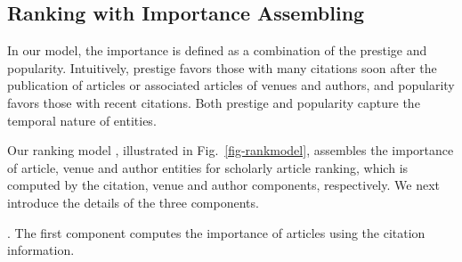 


\subsection{Ranking with Importance Assembling}
\label{subsec-ensemble}


In our model, the importance is defined as a combination of the prestige and popularity. Intuitively, prestige favors those with many citations soon after the publication of articles or associated articles of venues and authors, and popularity favors those with recent citations. Both prestige and popularity capture the temporal nature of entities. %

Our ranking model \ensemblerank,  illustrated in Fig.~\ref{fig-rankmodel}, assembles the importance of article, venue and author entities for scholarly article ranking, which is computed by the citation, venue and author components, respectively.
%
We next introduce the details of the three components.


.
The first component computes the importance of articles using the citation information.

